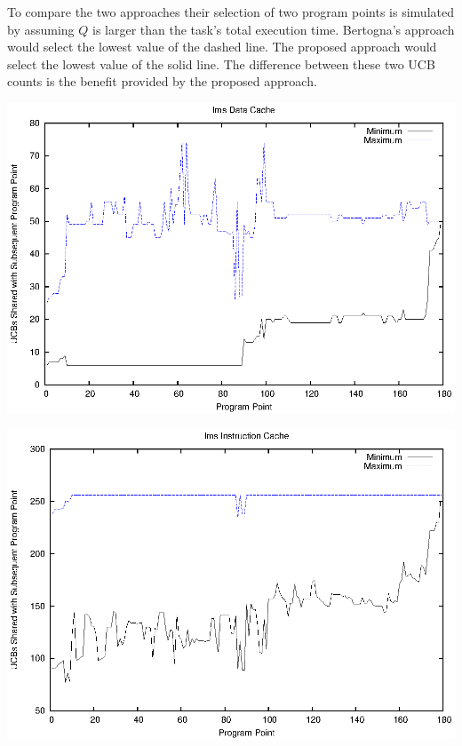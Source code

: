 To compare the two approaches their selection of two program points is
simulated by assuming ${Q}$ is larger than the task's total execution
time. Bertogna's approach would select the lowest value of the
dashed line. The proposed approach would select the lowest value of
the solid line. The difference between these two UCB counts is the
benefit provided by the proposed approach.
\begin{center}
  \includegraphics[width=\linewidth]{eps/lms-dcache.eps}
\end{center}
\begin{center}
  \includegraphics[width=\linewidth]{eps/lms-icache.eps}
\end{center}

